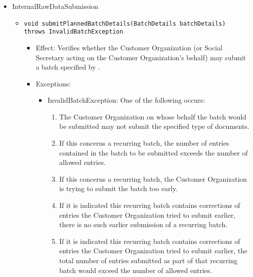 \begin{itemize}
    \item InternalRawDataSubmission
    \begin{itemize}
    	\item \texttt{void submitPlannedBatchDetails(BatchDetails batchDetails) throws InvalidBatchException}
    	\begin{itemize}
    		\item Effect: Verifies whether the Customer Organization (or Social Secretary acting on the Customer Organization's behalf) may submit a batch specified by .
    		\item Exceptions:
    		\begin{itemize}
    			\item InvalidBatchException: One of the following occurs:
    			\begin{enumerate}
    				\item The Customer Organization on whose behalf the batch would be submitted may not submit the specified type of documents.
    				\item If this concerns a recurring batch, the number of entries contained in the batch to be submitted exceeds the number of allowed entries.
    				\item If this concerns a recurring batch, the Customer Organization is trying to submit the batch too early.
    				\item If it is indicated this recurring batch contains corrections of entries the Customer Organization tried to submit earlier, there is no such earlier submission of a recurring batch.
    				\item If it is indicated this recurring batch contains corrections of entries the Customer Organization tried to submit earlier, the total number of entries submitted as part of that recurring batch would exceed the number of allowed entries.
    			\end{enumerate}
    		\end{itemize}
    	\end{itemize}
    	

\end{itemize}
\end{itemize}
